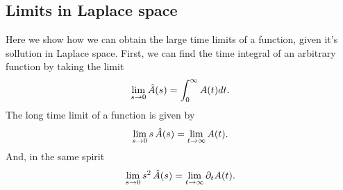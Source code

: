 \subsection{ Limits in Laplace space}
Here we show how we can obtain the large time limits of a function, given it's sollution in Laplace space. First, we can find the time integral of an arbitrary function by taking the limit
\begin{align}
\lim_{s \to 0} \hat{A}(s) = \int_0^\infty A(t) dt.
\elabel{si:int_vs_lap}
\end{align}
The long time limit of a function is given by
\begin{align}
\lim_{s \to 0} s \, \hat{A}(s) = \lim_{t \to \infty} A(t).
\elabel{si:longt_in_lap}
\end{align}
And, in the same spirit
\begin{align}
\lim_{s \to 0} s^2 \, \hat{A}(s) = \lim_{t \to \infty} \partial_t A(t).
\elabel{si:longt_in_lap2}
\end{align}


